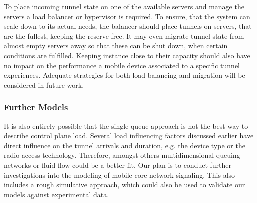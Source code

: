 To place incoming tunnel state on one of the available servers and manage the servers a load balancer or hypervisor is required. To ensure, that the system can scale down to its actual needs, the balancer should place tunnels on servers, that are the fullest, keeping the reserve free. It may even migrate tunnel state from almost empty servers away so that these can be shut down, when certain conditions are fulfilled. Keeping instance close to their capacity should also have no impact on the performance a mobile device associated to a specific tunnel experiences. Adequate strategies for both load balancing and migration will be considered in future work.



\subsubsection{Further Models}

It is also entirely possible that the single queue approach is not the best way to describe control plane load. Several load influencing factors discussed earlier have direct influence on the tunnel arrivals and duration, e.g. the device type or the radio access technology. Therefore, amongst others multidimensional queuing networks or fluid flow could be a better fit. Our plan is to conduct further investigations into the modeling of mobile core network signaling. This also includes a rough simulative approach, which could also be used to validate our models against experimental data.
